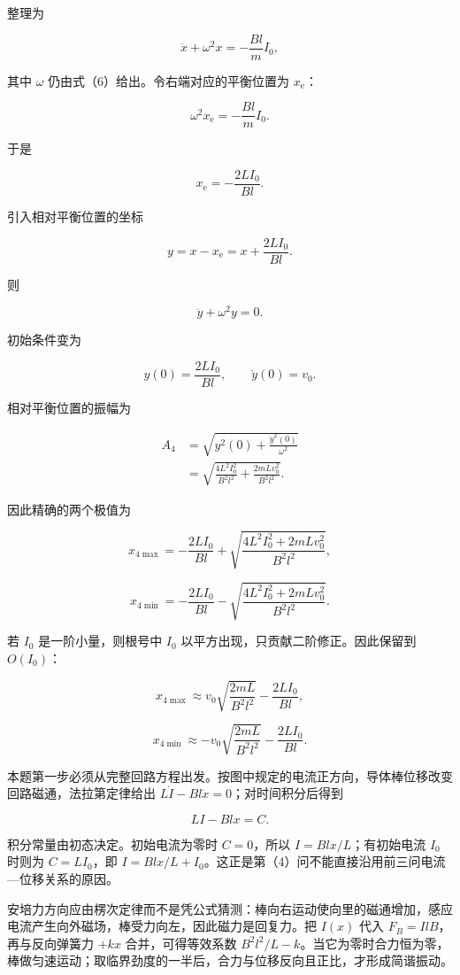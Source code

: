 \documentclass[12pt,a4paper,UTF8]{ctexart}
\begin{document}
整理为

\[\ddot x+\omega^2x=-\frac{Bl}{m}I_0, \tag{14}\]

其中 \(\omega\) 仍由式（6）给出。令右端对应的平衡位置为
\(x_{\mathrm e}\)：

\[\omega^2x_{\mathrm e}=-\frac{Bl}{m}I_0.\]

于是

\[\boxed{x_{\mathrm e}=-\frac{2LI_0}{Bl}}. \tag{15}\]

引入相对平衡位置的坐标

\[y=x-x_{\mathrm e}=x+\frac{2LI_0}{Bl}.\]

则

\[\ddot y+\omega^2y=0. \tag{16}\]

初始条件变为

\[y(0)=\frac{2LI_0}{Bl},\qquad \dot y(0)=v_0.\]

相对平衡位置的振幅为

\[\begin{aligned}
A_4
&=\sqrt{y^2(0)+\frac{\dot y^2(0)}{\omega^2}}\\
&=\sqrt{\frac{4L^2I_0^2}{B^2l^2}
+\frac{2mLv_0^2}{B^2l^2}}.
\end{aligned} \tag{17}\]

因此精确的两个极值为

\[\boxed{
x_{4\max}
=-\frac{2LI_0}{Bl}
+\sqrt{\frac{4L^2I_0^2+2mLv_0^2}{B^2l^2}}
}, \tag{18}\]

\[\boxed{
x_{4\min}
=-\frac{2LI_0}{Bl}
-\sqrt{\frac{4L^2I_0^2+2mLv_0^2}{B^2l^2}}
}. \tag{19}\]

若 \(I_0\) 是一阶小量，则根号中 \(I_0\)
以平方出现，只贡献二阶修正。因此保留到 \(O(I_0)\)：

\[\boxed{
x_{4\max}\approx v_0\sqrt{\frac{2mL}{B^2l^2}}
-\frac{2LI_0}{Bl}
}, \tag{20}\]

\[\boxed{
x_{4\min}\approx- v_0\sqrt{\frac{2mL}{B^2l^2}}
-\frac{2LI_0}{Bl}
}. \tag{21}\]

本题第一步必须从完整回路方程出发。按图中规定的电流正方向，导体棒位移改变回路磁通，法拉第定律给出
\(L\dot I-Bl\dot x=0\)；对时间积分后得到

\[LI-Blx=C.\]

积分常量由初态决定。初始电流为零时 \(C=0\)，所以 \(I=Blx/L\)；有初始电流
\(I_0\) 时则为 \(C=LI_0\)，即
\(I=Blx/L+I_0\)。这正是第（4）问不能直接沿用前三问电流---位移关系的原因。

安培力方向应由楞次定律而不是凭公式猜测：棒向右运动使向里的磁通增加，感应电流产生向外磁场，棒受力向左，因此磁力是回复力。把
\(I(x)\) 代入 \(F_B=IlB\)，再与反向弹簧力 \(+kx\) 合并，可得等效系数
\(B^2l^2/L-k\)。当它为零时合力恒为零，棒做匀速运动；取临界劲度的一半后，合力与位移反向且正比，才形成简谐振动。
\end{document}
